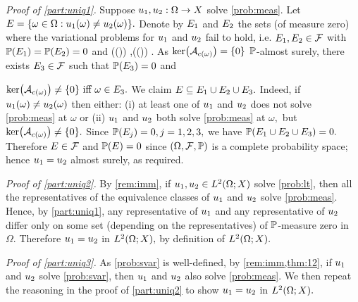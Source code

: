 \label{page:lemuniqproof}
\emph{Proof of \cref{part:uniq1}.} Suppose $u_{1},u_{2}:\Omega\rightarrow X$ solve \cref{prob:meas}. Let $E = \set{\omega \in \Omega \st \uo(\omega) \neq \ut(\omega)}.$ Denote by $E_{1}$ and $E_{2}$ the sets (of measure zero) where the variational problems for $u_{1}$ and $u_{2}$ fail to hold, i.e. $E_{1},E_{2} \in \mathcal F$ with $\mathbb P(E_{1})=\mathbb P(E_{2})=0$ and %
\beqs
\Acomega\mleft(\uo(\omega)\mright) \neq \Lcomega \tiff \omega \in \Eo,\quad{}\quad \Acomega\mleft(\ut(\omega)\mright) \neq \Lcomega \tiff \omega \in \Et.
\eeqs As  $\ker\mleft(\Acomega\mright) = \set{0}$ $\mathbb P$-almost surely, there exists $E_{3} \in \mathcal F$ such that $\mathbb P(E_{3}) = 0$ and

\noindent $\ker\mleft(\Acomega\mright) \neq \set{0} \tiff \omega \in \Eth.$
We claim $E \subseteq E_{1}\cup E_{2}\cup E_{3}.$ Indeed, if $u_{1}(\omega) \neq u_{2}(\omega)$ then either: (i) at least one of $u_{1}$ and $u_{2}$ does not solve \cref{prob:meas} at $\omega$ or (ii) $u_{1}$ and $u_{2}$ both solve \cref{prob:meas} at $\omega,$ but $\ker\mleft(\Acomega\mright) \neq \set{0}.$
Since $\mathbb P(E_j)=0, j = 1,2,3,$ we have $\mathbb P(E_{1}\cup E_{2}\cup E_{3}) = 0.$  Therefore $E \in \mathcal F$ and $\mathbb P(E)=0$ since $\OFP$ is a complete probability space; hence $u_{1} = u_{2}$ almost surely, as required.

\emph{Proof of \cref{part:uniq2}.} By \cref{rem:imm}, if $\uo,\ut \in \LtOX$ solve \cref{prob:lt}, then all the representatives of the equivalence classes of $u_{1}$ and $u_{2}$ solve \cref{prob:meas}. Hence, by \cref{part:uniq1}, any representative of $u_{1}$ and any representative of $u_{2}$ differ only on some set (depending on the representatives) of $\mathbb P$-measure zero in $\Omega.$ Therefore $u_{1}=u_{2}$ in $\LtOX,$ by definition of $\LtOX.$

\emph{Proof of \cref{part:uniq3}.} As \cref{prob:svar} is well-defined, by \cref{rem:imm,thm:12}, if $u_{1}$ and $u_{2}$ solve \cref{prob:svar}, then $u_{1}$ and $u_{2}$ also solve \cref{prob:meas}. We then repeat the reasoning in the proof of \cref{part:uniq2} to show $u_{1}=u_{2}$ in $\LtOX.$
\epf
